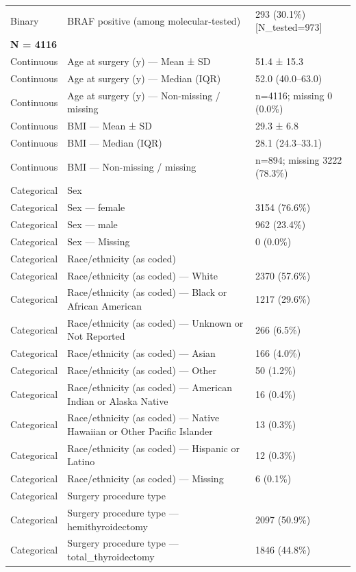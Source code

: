 \begin{table}[htbp]
\begin{tabular}{lll}
Binary & BRAF positive (among molecular-tested) & 293 (30.1\%) [N\_tested=973] \\
\multicolumn{3}{l}{\textbf{N = 4116}} \\
Continuous & Age at surgery (y) — Mean ± SD & 51.4 ± 15.3 \\
Continuous & Age at surgery (y) — Median (IQR) & 52.0 (40.0–63.0) \\
Continuous & Age at surgery (y) — Non-missing / missing & n=4116; missing 0 (0.0\%) \\
Continuous & BMI — Mean ± SD & 29.3 ± 6.8 \\
Continuous & BMI — Median (IQR) & 28.1 (24.3–33.1) \\
Continuous & BMI — Non-missing / missing & n=894; missing 3222 (78.3\%) \\
Categorical & Sex &  \\
Categorical & Sex — female & 3154 (76.6\%) \\
Categorical & Sex — male & 962 (23.4\%) \\
Categorical & Sex — Missing & 0 (0.0\%) \\
Categorical & Race/ethnicity (as coded) &  \\
Categorical & Race/ethnicity (as coded) — White & 2370 (57.6\%) \\
Categorical & Race/ethnicity (as coded) — Black or African American & 1217 (29.6\%) \\
Categorical & Race/ethnicity (as coded) — Unknown or Not Reported & 266 (6.5\%) \\
Categorical & Race/ethnicity (as coded) — Asian & 166 (4.0\%) \\
Categorical & Race/ethnicity (as coded) — Other & 50 (1.2\%) \\
Categorical & Race/ethnicity (as coded) — American Indian or Alaska Native & 16 (0.4\%) \\
Categorical & Race/ethnicity (as coded) — Native Hawaiian or Other Pacific Islander & 13 (0.3\%) \\
Categorical & Race/ethnicity (as coded) — Hispanic or Latino & 12 (0.3\%) \\
Categorical & Race/ethnicity (as coded) — Missing & 6 (0.1\%) \\
Categorical & Surgery procedure type &  \\
Categorical & Surgery procedure type — hemithyroidectomy & 2097 (50.9\%) \\
Categorical & Surgery procedure type — total\_thyroidectomy & 1846 (44.8\%) \\

\end{tabular}
\end{table}
